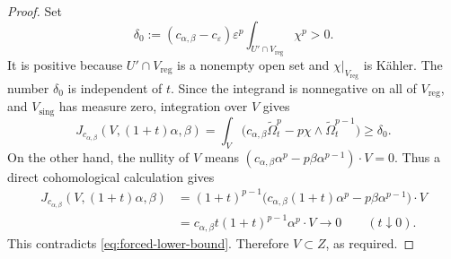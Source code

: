 \documentclass[reqno]{amsart}
\newcommand{\cab}{c_{\alpha,\beta}}
\newcommand{\reg}{\mathrm{reg}}
\newcommand{\sing}{\mathrm{sing}}
\theoremstyle{plain}
\theoremstyle{remark}
\begin{document}
\begin{proof}
Set
\[
 \delta_0:=(\cab-c_\varepsilon)\varepsilon^p
 \int_{U'\cap V_{\reg}}\chi^p>0.
\]
It is positive because $U'\cap V_{\reg}$ is a nonempty open set and
$\chi|_{V_{\reg}}$ is K\"ahler.  The number $\delta_0$ is independent
of $t$.  Since the integrand is nonnegative on all of $V_{\reg}$,
and $V_{\sing}$ has measure zero, integration over $V$ gives
\begin{equation}\label{eq:forced-lower-bound}
 J_{\cab}(V,(1+t)\alpha,\beta)
 =\int_V\bigl(\cab\widetilde\Omega_t^p
       -p\chi\wedge\widetilde\Omega_t^{p-1}\bigr)
 \geq\delta_0.
\end{equation}
On the other hand, the nullity of $V$ means
$(\cab\alpha^p-p\beta\alpha^{p-1})\cdot V=0$.  Thus a direct
cohomological calculation gives
\[
\begin{aligned}
 J_{\cab}(V,(1+t)\alpha,\beta)
 &=(1+t)^{p-1}
   \bigl(\cab(1+t)\alpha^p-p\beta\alpha^{p-1}\bigr)\cdot V\\
 &=\cab t(1+t)^{p-1}\alpha^p\cdot V
 \longrightarrow0 \qquad (t\downarrow0).
\end{aligned}
\]
This contradicts \eqref{eq:forced-lower-bound}.  Therefore
$V\subset Z$, as required.
\end{proof}
\end{document}
